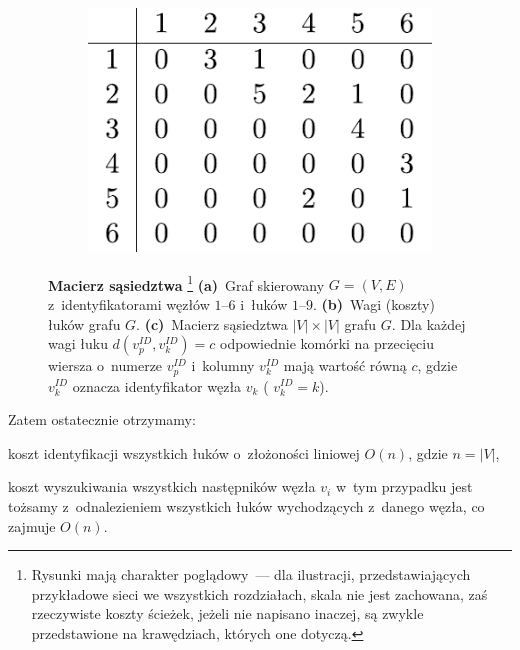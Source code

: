 \begin{savenotes}
\begin{figure}[!htbp]
\begin{subfigure}[b]{0.09\textwidth}
			\caption{}
			\label{fig:adjacencyMatrix:b}
		\end{subfigure}
		\hfill
		\begin{subfigure}[b]{0.35\textwidth}
			\includegraphics[width=\textwidth]{Chapter_I/ADJACENCY-MATRIX-Example/c.pdf}
			\caption{}
			\label{fig:adjacencyMatrix:c}
		\end{subfigure}
		\hfill\null
		\caption[Macierz sąsiedztwa]{
			\textbf{Macierz sąsiedztwa}
			\footnote{
				Rysunki mają charakter poglądowy~--- dla ilustracji, przedstawiających przykładowe sieci we wszystkich rozdziałach, skala nie jest zachowana, zaś rzeczywiste koszty ścieżek, jeżeli nie napisano inaczej, są zwykle przedstawione na krawędziach, których one dotyczą.
			}
			\textbf{(a)}~Graf skierowany $G = \left( V, E \right)$ z~identyfikatorami węzłów $1$--$6$ i~łuków $1$--$9$.
			\textbf{(b)}~Wagi (koszty) łuków grafu $G$.
			\textbf{(c)}~Macierz sąsiedztwa $\left| V \right| \times \left| V \right|$ grafu $G$.
			Dla każdej wagi łuku $d \left( v_{p}^{ID}, v_{k}^{ID} \right) = c$ odpowiednie komórki na przecięciu wiersza o~numerze $v_{p}^{ID}$ i~kolumny $v_{k}^{ID}$ mają wartość równą $c$, gdzie $v_{k}^{ID}$ oznacza identyfikator węzła $v_{k}$ ( $v_{k}^{ID} = k$).
		}
		\label{fig:adjacencyMatrix}
	\end{figure}
\end{savenotes}

Zatem ostatecznie otrzymamy:

\begin{myitemize}
	\item koszt identyfikacji wszystkich łuków o~złożoności liniowej $O \left( n \right)$, gdzie $n = \left| V \right|$,
	\item koszt wyszukiwania wszystkich następników węzła $v_{i}$ w~tym przypadku jest tożsamy z~odnalezieniem wszystkich łuków wychodzących z~danego węzła, co zajmuje $O \left( n \right)$.
\end{myitemize}



